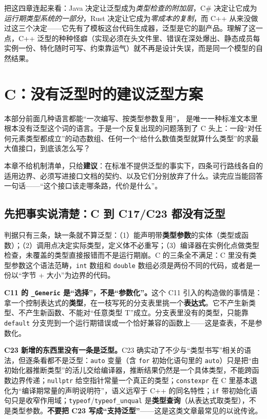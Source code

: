 \documentclass[12pt,a4paper,fontset=fandol]{ctexbook}
\newcommand{\clabel}{%
  \tcbox[on line,colback=cheadbg,colframe=cheadbg,
    boxrule=0pt,arc=1pt,left=2pt,right=2pt,top=1pt,bottom=1pt,
    colupper=white,fontupper=\scriptsize\bfseries]{C}}
\newcommand{\cpp}[1]{C++#1}
\newcommand{\kw}[1]{\texttt{#1}}
\begin{document}
把这四章连起来看：Java 决定让泛型成为\emph{类型检查的附加层}，C\# 决定让它成为\emph{运行期类型系统的一部分}，Rust
决定让它成为\emph{零成本的复制}，而 \cpp{} 从来没做过这三个决定——它先有了模板这台代码生成器，泛型是它的副产品。理解了这一点，\cpp{}
泛型的种种怪癖（实现必须在头文件里、错误在深处爆出、静态成员每实例一份、特化随时可写、约束靠运气）就不再是设计失误，而是同一个模型的自然结果。

\chapter{C：没有泛型时的建议泛型方案}

本部分前面几种语言都能“一次编写、按类型参数复用”，\clabel{} 是唯一一种标准文本里根本没有泛型这个词的语言。于是一个反复出现的问题落到了 C 头上：一段“对任何元素类型都成立”的动态数组、任何一个“给什么数值类型就算什么类型”的求最大值接口，到底该怎么写？

本章不给机制清单，只给\textbf{建议}：在标准不提供泛型的事实下，四条可行路线各自的适用边界、必须写进接口文档的契约、以及它们分别放弃了什么。读完应当能回答一句话——“这个接口该走哪条路，代价是什么”。

\section{先把事实说清楚：C 到 C17/C23 都没有泛型}

判据只有三条，缺一条就不算泛型：（1）能声明带\textbf{类型参数}的实体（类型或函数）；（2）调用点决定实际类型，定义体不必重写；（3）编译器在实例化点做类型检查，未覆盖的类型直接报错而不是运行期崩。C 的三条全不满足：C 里没有类型参数这个语法范畴，\kw{int} 数组和 \kw{double} 数组必须是两份不同的代码，或者是一份以“字节 + 大小”为边界的代码。

\textbf{C11 的 \kw{\_Generic} 是“选择”，不是“参数化”。}这个 C11 引入的构造做的事情是：拿一个控制表达式的\textbf{类型}，在一枝写死的分支表里挑一个\textbf{表达式}。它不产生新类型、不产生新函数、不能对“任意类型 T”成立。分支表里没有的类型，只能靠 \kw{default} 分支兜到一个运行期错误或一个恰好兼容的函数上——这是查表，不是参数化。

\textbf{C23 新增的东西里没有一条是泛型。}C23 确实动了不少与“类型书写”相关的语法，但逐条看都不是泛型：\kw{auto} 变量（含 \kw{for} 初始化语句里的 \kw{auto}）只是把“由初始化器推断类型”的活儿交给编译器，推断结果仍然是一个具体类型，不能跨函数边界传递；\kw{nullptr} 给空指针常量一个真正的类型；\kw{constexpr} 在 C 里基本退化为“编译期常量的声明说明符”，语义远窄于 \cpp{} 的同名特性；\kw{if} 带初始化语句只是收窄作用域；\kw{typeof}/\kw{typeof\_unqual} 是\textbf{类型查询}（从表达式取类型），不是类型参数。\textbf{不要把 C23 写成“支持泛型”}——这是这类文章最常见的以讹传讹。
\end{document}
